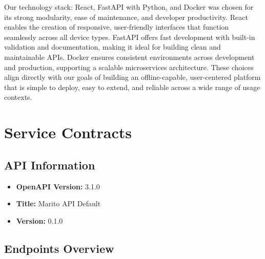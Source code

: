\documentclass[12pt]{article}
\begin{document}
Our technology stack: React, FastAPI with Python, and Docker was chosen for its strong modularity, ease of maintenance, and developer productivity. React enables the creation of responsive, user-friendly interfaces that function seamlessly across all device types. FastAPI offers fast development with built-in validation and documentation, making it ideal for building clean and maintainable APIs. Docker ensures consistent environments across development and production, supporting a scalable microservices architecture. These choices align directly with our goals of building an offline-capable, user-centered platform that is simple to deploy, easy to extend, and reliable across a wide range of usage contexts.



\section{Service Contracts}

\subsection{API Information}
\begin{itemize}
    \item \textbf{OpenAPI Version:} 3.1.0
    \item \textbf{Title:} Marito API Default
    \item \textbf{Version:} 0.1.0
\end{itemize}

\subsection{Endpoints Overview}
\end{document}
